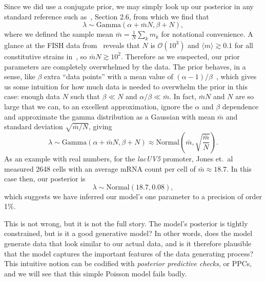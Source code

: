 Since we did use a conjugate prior, we may simply look up our posterior in any
standard reference such as~\cite{Gelman2013}, Section 2.6,
from which we find that
\begin{equation}
\lambda
\sim \text{Gamma}\left(\alpha + \bar{m}N, \beta + N\right),
\end{equation}
where we defined the sample mean $\bar{m} = \frac{1}{N}\sum_k m_k$ for
notational convenience. A glance at the FISH data from~\cite{Jones2014} reveals
that $N$ is $\mathcal{O}(10^3)$ and $\langle m\rangle \gtrsim 0.1$ for all
constitutive strains in~\cite{Jones2014}, so $\bar{m}N \gtrsim 10^2$. Therefore
as we suspected, our prior parameters are completely overwhelmed by the data.
The prior behaves, in a sense, like $\beta$ extra ``data points''
with a mean value of $(\alpha-1)/\beta$~\cite{Gelman2013}, which
gives us some intuition for how much data is needed to overwhelm
the prior in this case: enough data $N$ such that $\beta\ll N$
and $\alpha/\beta \ll \bar{m}$. In
fact, $\bar{m}N$ and $N$ are so large that we can, to an excellent
approximation, ignore the $\alpha$ and $\beta$ dependence and approximate the
gamma distribution as a Gaussian with mean $\bar{m}$ and standard deviation
$\sqrt{\bar{m}/N}$, giving
\begin{equation}
\lambda
\sim \text{Gamma}\left(\alpha + \bar{m}N, \beta + N\right)
\approx \text{Normal}\left(\bar{m}, \sqrt{\frac{\bar{m}}{N}}\right).
\end{equation}
As an example with real numbers, for the \textit{lacUV5} promoter, Jones et.\
al~\cite{Jones2014} measured 2648 cells with an average mRNA count per cell of
$\bar{m} \approx 18.7$. In this case then, our posterior is
\begin{equation}
\lambda
\sim \text{Normal}\left(18.7, 0.08\right),
\end{equation}
which suggests we have inferred our model's one parameter to a precision of
order 1\%.

This is not wrong, but it is not the full story. The model's posterior is
tightly constrained, but is it a good generative model? In other words, does the
model generate data that look similar to our actual data, and is it therefore
plausible that the model captures the important features of the data generating
process? This intuitive notion can be codified with \textit{posterior predictive
checks}, or PPCs, and we will see that this simple Poisson model fails badly.

